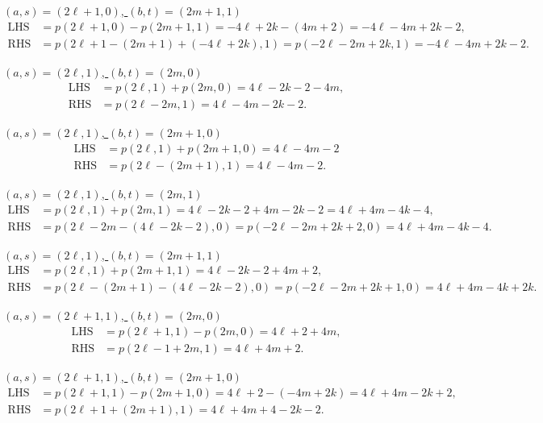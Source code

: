 \documentclass[12pt]{amsart}
\theoremstyle{definition}
\begin{document}
{\noindent\underline{$(a,s)=(2\ell+1,0)$, $(b,t)=(2m+1,1)$}
\begin{align*}
  \text{LHS} &= p(2\ell+1,0)-p(2m+1,1)=-4\ell+2k-(4m+2)=-4\ell-4m+2k-2,\\
  \text{RHS} &= p(2\ell+1-(2m+1)+(-4\ell+2k),1)= p(-2\ell-2m+2k,1)
                               =-4\ell-4m+2k-2.
\end{align*}

\noindent\underline{$(a,s)=(2\ell,1)$, $(b,t)=(2m,0)$}
\begin{align*}
  \text{LHS} &= p(2\ell,1)+p(2m,0)=4\ell-2k-2-4m,\\
  \text{RHS} &= p(2\ell-2m,1)=4\ell-4m-2k-2.
\end{align*}

\noindent\underline{$(a,s)=(2\ell,1)$, $(b,t)=(2m+1,0)$}
\begin{align*}
  \text{LHS} &= p(2\ell,1)+p(2m+1,0)=4\ell-4m-2\\
  \text{RHS} &= p(2\ell-(2m+1),1)=4\ell-4m-2.
\end{align*}

\noindent\underline{$(a,s)=(2\ell,1)$, $(b,t)=(2m,1)$}
\begin{align*}
  \text{LHS} &= p(2\ell,1)+p(2m,1)=4\ell-2k-2+4m-2k-2=4\ell+4m-4k-4,\\
  \text{RHS} &= p(2\ell-2m-(4\ell-2k-2),0)=p(-2\ell-2m+2k+2,0)
                                   =4\ell+4m-4k-4.
\end{align*}

\noindent\underline{$(a,s)=(2\ell,1)$, $(b,t)=(2m+1,1)$}
\begin{align*}
  \text{LHS} &= p(2\ell,1)+p(2m+1,1)=4\ell-2k-2+4m+2,\\
  \text{RHS} &= p(2\ell-(2m+1)-(4\ell-2k-2),0)
  = p(-2\ell-2m+2k+1,0)=4\ell+4m-4k+2k.
\end{align*}

\noindent\underline{$(a,s)=(2\ell+1,1)$, $(b,t)=(2m,0)$}
\begin{align*}
  \text{LHS} &= p(2\ell+1,1)-p(2m,0)=4\ell+2+4m,\\
  \text{RHS} &= p(2\ell-1+2m,1)=4\ell+4m+2.
\end{align*}

\noindent\underline{$(a,s)=(2\ell+1,1)$, $(b,t)=(2m+1,0)$}
\begin{align*}
  \text{LHS} &= p(2\ell+1,1)-p(2m+1,0)
                                   =4\ell+2-(-4m+2k)=4\ell+4m-2k+2,\\
  \text{RHS} &= p(2\ell+1+(2m+1),1)
  =4\ell+4m+4-2k-2.
\end{align*}

}
\end{document}
